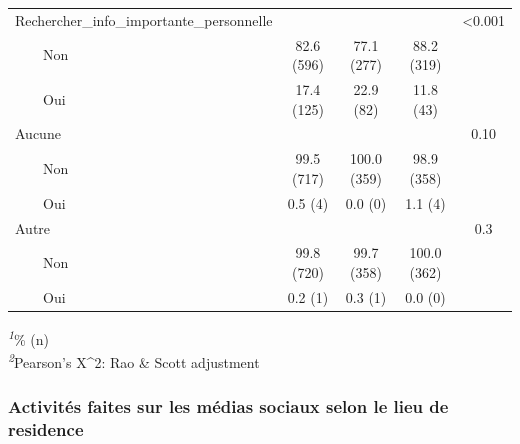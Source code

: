 \documentclass[
]{article}
\begin{document}
\begin{table}[!t]
\begin{tabular*}{\linewidth}{@{\extracolsep{\fill}}lcccc}
Rechercher\_info\_importante\_personnelle &  &  &  & <0.001 \\ 
    Non & 82.6 (596) & 77.1 (277) & 88.2 (319) &  \\ 
    Oui & 17.4 (125) & 22.9 (82) & 11.8 (43) &  \\ 
Aucune &  &  &  & 0.10 \\ 
    Non & 99.5 (717) & 100.0 (359) & 98.9 (358) &  \\ 
    Oui & 0.5 (4) & 0.0 (0) & 1.1 (4) &  \\ 
Autre &  &  &  & 0.3 \\ 
    Non & 99.8 (720) & 99.7 (358) & 100.0 (362) &  \\ 
    Oui & 0.2 (1) & 0.3 (1) & 0.0 (0) &  \\ 
\bottomrule
\end{tabular*}
\begin{minipage}{\linewidth}
\textsuperscript{\textit{1}}\% (n)\\
\textsuperscript{\textit{2}}Pearson's X\^{}2: Rao \& Scott adjustment\\
\end{minipage}
\end{table}

\hypertarget{activituxe9s-faites-sur-les-muxe9dias-sociaux-selon-le-lieu-de-residence}{%
\subsubsection{Activités faites sur les médias sociaux selon le lieu de
residence}\label{activituxe9s-faites-sur-les-muxe9dias-sociaux-selon-le-lieu-de-residence}}
\end{document}
